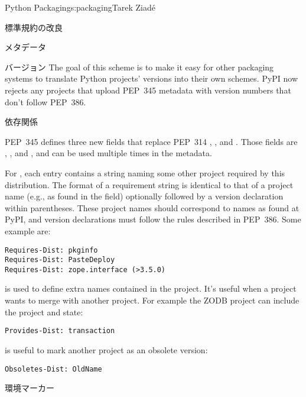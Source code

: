 \begin{aosachapter}{Python Packaging}{s:packaging}{Tarek Ziad\'{e}}
\begin{aosasect1}{標準規約の改良}
\begin{aosasect2}{メタデータ}
\begin{aosasect3}{バージョン}
\noindent
The goal of this scheme is to make it easy for other packaging systems
to translate Python projects' versions into their own schemes.  PyPI
now rejects any projects that upload PEP~345 metadata with version numbers
that don't follow PEP~386.

\end{aosasect3}

\begin{aosasect3}{依存関係}

PEP~345 defines three new fields that replace PEP~314 ,
, and . Those fields are
, , and ,
and can be used multiple times in the metadata.

For , each entry contains a string naming some
other  project required by this distribution.  The
format of a requirement string is identical to that of a
 project name (e.g., as found in the  field)
optionally followed by a version declaration within parentheses.
These  project names should correspond to names as
found at PyPI, and version declarations must follow the rules
described in PEP~386. Some example are:

\begin{verbatim}
Requires-Dist: pkginfo
Requires-Dist: PasteDeploy
Requires-Dist: zope.interface (>3.5.0)
\end{verbatim}

\noindent {} is used to define extra names contained in the
project.  It's useful when a project wants to merge with another
project. For example the ZODB project can include the
 project and state:

\begin{verbatim}
Provides-Dist: transaction
\end{verbatim}

\noindent {} is useful to mark another project as an obsolete
version:

\begin{verbatim}
Obsoletes-Dist: OldName
\end{verbatim}

\end{aosasect3}

\begin{aosasect3}{環境マーカー}


\end{aosasect3}
\end{aosasect2}
\end{aosasect1}
\end{aosachapter}
